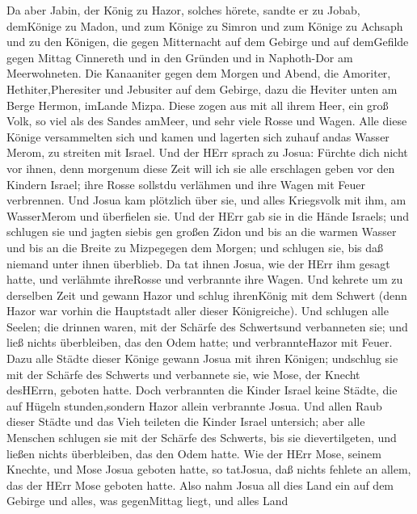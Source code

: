  Da aber Jabin, der König zu Hazor, solches hörete, sandte
er zu Jobab, demKönige zu Madon, und zum Könige zu Simron und zum Könige
zu Achsaph  und zu den Königen, die gegen Mitternacht auf
dem Gebirge und auf demGefilde gegen Mittag Cinnereth und in den Gründen
und in Naphoth-Dor am Meerwohneten.  Die Kanaaniter gegen
dem Morgen und Abend, die Amoriter, Hethiter,Pheresiter und Jebusiter
auf dem Gebirge, dazu die Heviter unten am Berge Hermon, imLande Mizpa.
 Diese zogen aus mit all ihrem Heer, ein groß Volk, so viel
als des Sandes amMeer, und sehr viele Rosse und Wagen.  Alle
diese Könige versammelten sich und kamen und lagerten sich zuhauf andas
Wasser Merom, zu streiten mit Israel.  Und der HErr sprach
zu Josua: Fürchte dich nicht vor ihnen, denn morgenum diese Zeit will
ich sie alle erschlagen geben vor den Kindern Israel; ihre Rosse
sollstdu verlähmen und ihre Wagen mit Feuer verbrennen.  Und
Josua kam plötzlich über sie, und alles Kriegsvolk mit ihm, am
WasserMerom und überfielen sie.  Und der HErr gab sie in die
Hände Israels; und schlugen sie und jagten siebis gen großen Zidon und
bis an die warmen Wasser und bis an die Breite zu Mizpegegen dem Morgen;
und schlugen sie, bis daß niemand unter ihnen überblieb.  Da
tat ihnen Josua, wie der HErr ihm gesagt hatte, und verlähmte ihreRosse
und verbrannte ihre Wagen.  Und kehrete um zu derselben
Zeit und gewann Hazor und schlug ihrenKönig mit dem Schwert (denn Hazor
war vorhin die Hauptstadt aller dieser Königreiche).  Und
schlugen alle Seelen; die drinnen waren, mit der Schärfe des Schwertsund
verbanneten sie; und ließ nichts überbleiben, das den Odem hatte; und
verbrannteHazor mit Feuer.  Dazu alle Städte dieser Könige
gewann Josua mit ihren Königen; undschlug sie mit der Schärfe des
Schwerts und verbannete sie, wie Mose, der Knecht desHErrn, geboten
hatte.  Doch verbrannten die Kinder Israel keine Städte,
die auf Hügeln stunden,sondern Hazor allein verbrannte Josua.
 Und allen Raub dieser Städte und das Vieh teileten die
Kinder Israel untersich; aber alle Menschen schlugen sie mit der Schärfe
des Schwerts, bis sie dievertilgeten, und ließen nichts überbleiben, das
den Odem hatte.  Wie der HErr Mose, seinem Knechte, und
Mose Josua geboten hatte, so tatJosua, daß nichts fehlete an allem, das
der HErr Mose geboten hatte.  Also nahm Josua all dies Land
ein auf dem Gebirge und alles, was gegenMittag liegt, und alles Land
